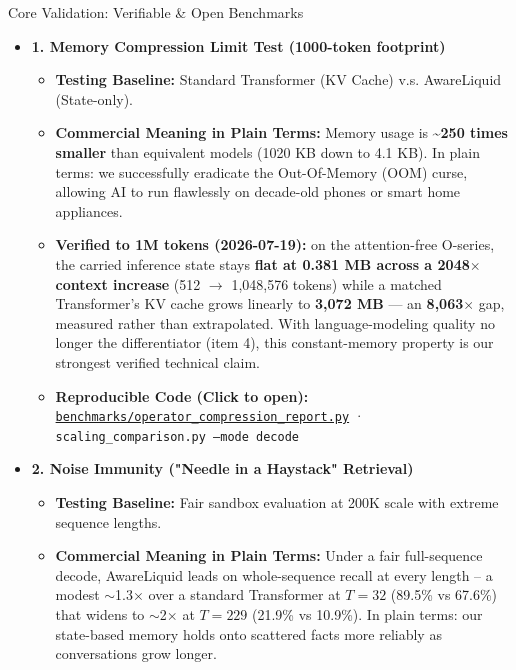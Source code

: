 ﻿\documentclass[aspectratio=169, 10pt]{beamer}
\begin{document}
\begin{frame}[allowframebreaks]{Core Validation: Verifiable \& Open Benchmarks}
\footnotesize
\begin{itemize}\itemsep=0.3em
    \item \textbf{1. Memory Compression Limit Test (1000-token footprint)}
    \begin{itemize}
        \item \textbf{Testing Baseline:} Standard Transformer (KV Cache) v.s. AwareLiquid (State-only).
        \item \textbf{Commercial Meaning in Plain Terms:} Memory usage is \textbf{\textasciitilde 250 times smaller} than equivalent models (1020 KB down to 4.1 KB). In plain terms: we successfully eradicate the Out-Of-Memory (OOM) curse, allowing AI to run flawlessly on decade-old phones or smart home appliances.
        \item \textbf{Verified to 1M tokens (2026-07-19):} on the attention-free O-series, the carried inference state stays \textbf{flat at 0.381 MB across a 2048$\times$ context increase} (512 $\to$ 1{,}048{,}576 tokens) while a matched Transformer's KV cache grows linearly to \textbf{3{,}072 MB} --- an \textbf{8{,}063$\times$} gap, measured rather than extrapolated. With language-modeling quality no longer the differentiator (item 4), this constant-memory property is our strongest verified technical claim.
        \item \textbf{Reproducible Code (Click to open):} \href{https://github.com/everest-an/M1/blob/main/benchmarks/operator_compression_report.py}{\texttt{benchmarks/operator\_compression\_report.py}} · \texttt{scaling\_comparison.py --mode decode}
    \end{itemize}
    \vspace{0.4em}
    \item \textbf{2. Noise Immunity ("Needle in a Haystack" Retrieval)}
    \begin{itemize}
        \item \textbf{Testing Baseline:} Fair sandbox evaluation at 200K scale with extreme sequence lengths.
        \item \textbf{Commercial Meaning in Plain Terms:} Under a fair full-sequence decode, AwareLiquid leads on whole-sequence recall at every length -- a modest $\sim$1.3$\times$ over a standard Transformer at $T=32$ (89.5\% vs 67.6\%) that widens to $\sim$2$\times$ at $T=229$ (21.9\% vs 10.9\%). In plain terms: our state-based memory holds onto scattered facts more reliably as conversations grow longer.

\end{itemize}
\end{itemize}
\end{frame}
\end{document}
